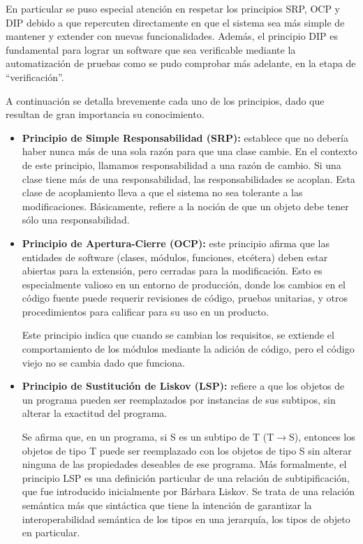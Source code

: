 \par En particular se puso especial atención en respetar los principios SRP, OCP y DIP debido a que repercuten directamente en que el sistema sea más simple de mantener y extender con nuevas funcionalidades. Además, el principio DIP es fundamental para lograr un software que sea verificable mediante la automatización de pruebas como se pudo comprobar más adelante, en la etapa de “verificación”.

A continuación se detalla brevemente cada uno de los principios, dado que resultan de gran importancia su conocimiento.

\begin{itemize}
	\item \textbf{Principio de Simple Responsabilidad (SRP):} establece que no debería haber nunca más de una sola razón para que una clase cambie. En el contexto de este principio, llamamos responsabilidad a una razón de cambio. Si una clase tiene más de una responsabilidad, las responsabilidades se acoplan. Esta clase de acoplamiento lleva a que el sistema no sea tolerante a las modificaciones. Básicamente, refiere a la noción de que un objeto debe tener sólo una responsabilidad.
	
	\item \textbf{Principio de Apertura-Cierre (OCP):} este principio afirma que las entidades de software (clases, módulos, funciones, etcétera) deben estar abiertas para la extensión, pero cerradas para la modificación. Esto es especialmente valioso en un entorno de producción, donde los cambios en el código fuente puede requerir revisiones de código, pruebas unitarias, y otros procedimientos para calificar para su uso en un producto.
	\par Este principio indica que cuando se cambian los requisitos, se extiende el comportamiento de los módulos mediante la adición de código, pero el código viejo no se cambia dado que funciona.

	\item \textbf{Principio de Sustitución de Liskov (LSP):} refiere a que los objetos de un programa pueden ser reemplazados por instancias de sus subtipos, sin alterar la exactitud del programa.
	\par Se afirma que, en un programa, si \textsc{S} es un subtipo de \textsc{T} (\textsc{T}$\to$\textsc{S}), entonces los objetos de tipo \textsc{T} puede ser reemplazado con los objetos de tipo \textsc{S} sin alterar ninguna de las propiedades deseables de ese programa. Más formalmente, el principio LSP es una definición particular de una relación de subtipificación, que fue introducido inicialmente por Bárbara Liskov. Se trata de una relación semántica más que sintáctica que tiene la intención de garantizar la interoperabilidad semántica de los tipos en una jerarquía, los tipos de objeto en particular. 


\end{itemize}
